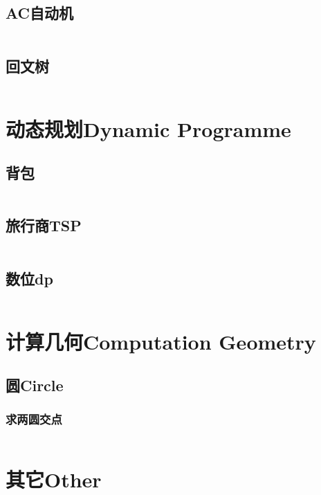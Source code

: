 \documentclass[twoside,sub3section,UTF8]{ctexart}						%
\begin{document}
	\subsection{AC自动机}
		\inputminted{c++}{"String/AC.cpp"}
	\subsection{回文树}
		\inputminted{c++}{"String/PAM.cpp"}
	
\section{动态规划Dynamic Programme}
	\subsection{背包}
		\inputminted{c++}{"Dynamic Programme/bag.cpp"}
	\subsection{旅行商TSP}
		\inputminted{c++}{"Dynamic Programme/TSP.cpp"}
	\subsection{数位dp}
		\inputminted{c++}{"Dynamic Programme/digit.cpp"}

\section{计算几何Computation Geometry}


	\subsection{圆Circle}
		\subsubsection{求两圆交点}
		\inputminted{c++}{"Computation Geometry/Circle/twopoint.cpp"}

\newpage
\section{其它Other}
\end{document}
